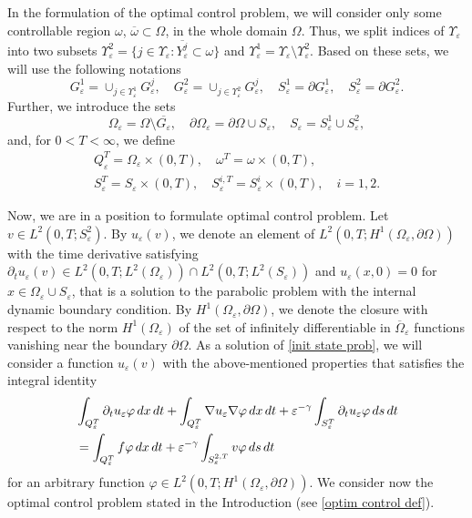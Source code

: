 \documentclass[10pt,a4paper]{amsart}
\numberwithin{equation}{section}
\begin{document}
In the formulation of the optimal control problem, we will consider only
some controllable region $\omega$, $\overline{\omega}\subset \Omega$, in the
whole domain $\Omega$. Thus, we split indices of $\Upsilon_\varepsilon$ into
two subsets $\Upsilon^2_{\varepsilon}=\{j\in \Upsilon_{\varepsilon}:
\overline{Y^{j}_{\varepsilon}}\subset \omega \}$ and 
$\Upsilon^{1}_\varepsilon = \Upsilon_\varepsilon \setminus \Upsilon^2_\varepsilon$.
Based on these sets, we will use the following notations
\[
G_{\varepsilon}^{1}=\cup_{j\in \Upsilon^{1}_{\varepsilon}}{G^{j}_{\varepsilon}},\quad
G_{\varepsilon}^2=\cup_{j\in
\Upsilon^2_{\varepsilon}}{G^{j}_{\varepsilon}}, \quad 
S^{1}_\varepsilon = \partial G^{1}_\varepsilon,\quad
S^2_\varepsilon = \partial G^2_\varepsilon.
\]
Further, we introduce the sets
\[
\Omega_{\varepsilon}=\Omega \setminus \overline{G_{\varepsilon}},\quad
\partial \Omega_{\varepsilon}=\partial \Omega \cup S_{\varepsilon},\quad
S_{\varepsilon}=S_{\varepsilon}^{1}\cup S_{\varepsilon}^2,
\]
and, for $0<T<\infty$, we define
\begin{gather*}
Q^{T}_{\varepsilon}=\Omega_{\varepsilon}\times (0,T),\quad
 \omega^{T}=\omega \times (0,T), \\
S_{\varepsilon}^{T}=S_{\varepsilon}\times(0,T),\quad
S_{\varepsilon}^{i,T}=S_{\varepsilon}^{i}\times (0,T),\quad i=1,2.
\end{gather*}

Now, we are in a position to formulate optimal control problem. 
Let $v\in L^2(0,T;S_{\varepsilon }^2)$. By $u_{\varepsilon }(v)$, we denote an
element of $L^2(0,T;H^{1}(\Omega _{\varepsilon },\partial \Omega ))$ with
the time derivative satisfying $\partial _{t}u_{\varepsilon }(v)\in
L^2(0,T;L^2(\Omega _{\varepsilon }))\cap
L^2(0,T;L^2(S_{\varepsilon }))$ and $u_{\varepsilon }(x,0)=0$ for $x\in
\Omega _{\varepsilon }\cup S_{\varepsilon }$, that is a solution to the
parabolic problem with the internal dynamic boundary condition. By $%
H^{1}(\Omega _{\varepsilon },\partial \Omega )$, we denote the closure with
respect to the norm $H^{1}(\Omega _{\varepsilon })$ of the set of infinitely
differentiable in $\overline{\Omega }_{\varepsilon }$ functions vanishing
near the boundary $\partial \Omega $. As a solution of
\eqref{init state prob}, we will consider a function $u_{\varepsilon }(v)$ with the
above-mentioned properties that satisfies the  integral identity
\begin{equation}
\begin{aligned}
&\int _{Q_{\varepsilon }^{T}}\partial _{t}u_{\varepsilon }\varphi {\,dx\,dt%
}+\int _{Q_{\varepsilon }^{T}}\nabla u_{\varepsilon }\nabla \varphi {%
\,dx\,dt}+\varepsilon ^{-\gamma }\int _{S_{\varepsilon }^{T}}\partial
_{t}u_{\varepsilon }\varphi \,ds\,dt \\
&=\int _{Q_{\varepsilon
}^{T}}f\varphi\,dx\,dt+\varepsilon ^{-\gamma }\int _{S_{\varepsilon
}^{2,T}}v\varphi \,ds\,dt
\end{aligned}  \label{int ident u}
\end{equation}
for an arbitrary function $\varphi \in L^2(0,T;H^{1}(\Omega _{\varepsilon
},\partial \Omega ))$. We consider now the optimal control problem stated in
the Introduction (see \eqref{optim control def}).
\end{document}
